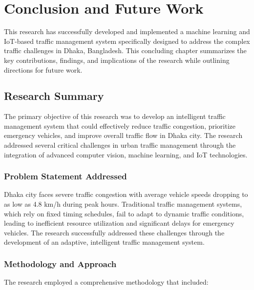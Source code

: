 \chapter{Conclusion and Future Work}
\label{ch:conclusion}

This research has successfully developed and implemented a machine learning and IoT-based traffic management system specifically designed to address the complex traffic challenges in Dhaka, Bangladesh. This concluding chapter summarizes the key contributions, findings, and implications of the research while outlining directions for future work.

\section{Research Summary}
\label{sec:research_summary}

The primary objective of this research was to develop an intelligent traffic management system that could effectively reduce traffic congestion, prioritize emergency vehicles, and improve overall traffic flow in Dhaka city. The research addressed several critical challenges in urban traffic management through the integration of advanced computer vision, machine learning, and IoT technologies.

\subsection{Problem Statement Addressed}
Dhaka city faces severe traffic congestion with average vehicle speeds dropping to as low as 4.8 km/h during peak hours. Traditional traffic management systems, which rely on fixed timing schedules, fail to adapt to dynamic traffic conditions, leading to inefficient resource utilization and significant delays for emergency vehicles. The research successfully addressed these challenges through the development of an adaptive, intelligent traffic management system.

\subsection{Methodology and Approach}
The research employed a comprehensive methodology that included:

